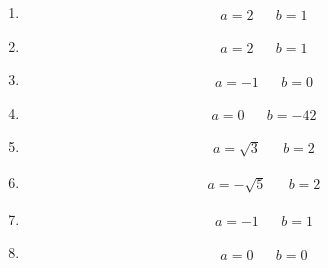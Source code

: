 {	\begin{enumerate}
		\item 
			\begin{align*}
				a = 2	&& b = 1
			\end{align*}
		\item
			\begin{align*}
				a = 2	&& b = 1
			\end{align*}
		\item 
			\begin{align*}
				a = -1	&& b = 0
			\end{align*}
		\item 
			\begin{align*}
				a = 0	&& b = -42
			\end{align*}
		\item 
			\begin{align*}
				a = \sqrt{3}	&& b = 2
			\end{align*}
		\item 
			\begin{align*}
				a = -\sqrt{5}	&& b = 2
			\end{align*}
		\item 
			\begin{align*}
				a = -1	&& b = 1
			\end{align*}
		\item
			\begin{align*}
				a = 0	&& b = 0
			\end{align*}
	\end{enumerate}


}


